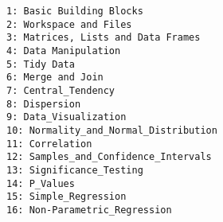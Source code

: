 \documentclass[12pt,article]{article}
\begin{document}
\large
\begin{verbatim}
1: Basic Building Blocks
2: Workspace and Files
3: Matrices, Lists and Data Frames
4: Data Manipulation
5: Tidy Data
6: Merge and Join
7: Central_Tendency
8: Dispersion
9: Data_Visualization
10: Normality_and_Normal_Distribution
11: Correlation
12: Samples_and_Confidence_Intervals
13: Significance_Testing
14: P_Values
15: Simple_Regression
16: Non-Parametric_Regression
\end{verbatim}
\end{document}
